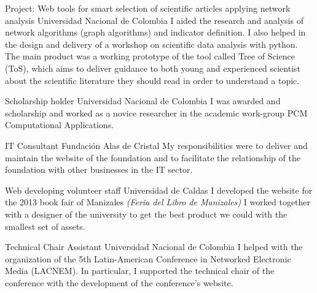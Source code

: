 \documentclass[12pt,english]{moderncv}
\begin{document}
        {Project: Web tools for smart selection of scientific articles applying network analysis}
        {Universidad Nacional de Colombia}
        {}
        {}
        {%
            I aided the research and analysis of network algorithms (graph
            algorithms) and indicator definition. I also helped in the design
            and delivery of a workshop on scientific data analysis with python.
            The main product was a working prototype of the tool called Tree of
            Science (ToS), which aims to deliver guidance to both young and
            experienced scientist about the scientific literature they should
            read in order to understand a topic.
        }

        {Scholarship holder}
        {Universidad Nacional de Colombia}
        {}
        {}
        {%
            I was awarded and scholarship and worked as a novice researcher in
            the academic work-group PCM Computational Applications.
        }

        {IT Consultant}
        {Fundación Alas de Cristal}
        {}
        {}
        {%
            My responsibilities were to deliver and maintain the website of the
            foundation and to facilitate the relationship of the foundation
            with other businesses in the IT sector.
        }

        {Web developing volunteer staff}
        {Universidad de Caldas}
        {}
        {}
        {%
            I developed the website for the 2013 book fair of Manizales
            \textit{(Feria del Libro de Manizales)} I worked together with a
            designer of the university to get the best product we could with
            the smallest set of assets.
        }

        {Technical Chair Assistant}
        {Universidad Nacional de Colombia}
        {}
        {}
        {%
            I helped with the organization of the 5th Latin-American Conference
            in Networked Electronic Media (LACNEM). In particular, I supported
            the technical chair of the conference with the development of the
            conference's website.
        }
\end{document}
